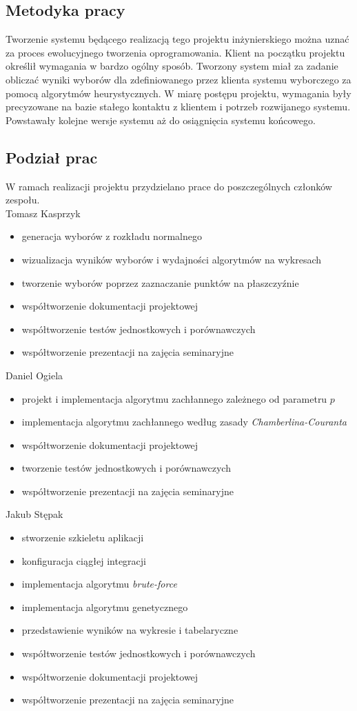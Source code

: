 \documentclass[polish,11pt]{aghthesis}
\begin{document}
\subsection{Metodyka pracy}
Tworzenie systemu będącego realizacją tego projektu inżynierskiego można uznać za
proces ewolucyjnego tworzenia oprogramowania. Klient na początku projektu określił
wymagania w bardzo ogólny sposób. Tworzony system miał za zadanie obliczać wyniki
wyborów dla zdefiniowanego przez klienta systemu wyborczego za pomocą algorytmów
heurystycznych. W miarę postępu projektu, wymagania były precyzowane na bazie stałego
kontaktu z klientem i potrzeb rozwijanego systemu. Powstawały kolejne wersje systemu aż
do osiągnięcia systemu końcowego.

\subsection{Podział prac}
W ramach realizacji projektu przydzielano prace do poszczególnych członków zespołu.
\vspace{\baselineskip} \\
Tomasz Kasprzyk
\begin{itemize}
\item generacja wyborów z rozkładu normalnego
\item wizualizacja wyników wyborów i wydajności algorytmów na wykresach
\item tworzenie wyborów poprzez zaznaczanie punktów na płaszczyźnie
\item współtworzenie dokumentacji projektowej
\item współtworzenie testów jednostkowych i porównawczych
\item współtworzenie prezentacji na zajęcia seminaryjne
\end{itemize}
Daniel Ogiela
\begin{itemize}
\item projekt i implementacja algorytmu zachłannego zależnego od parametru $p$
\item implementacja algorytmu zachłannego według zasady \textit{Chamberlina-Couranta}
\item współtworzenie dokumentacji projektowej
\item tworzenie testów jednostkowych i porównawczych
\item współtworzenie prezentacji na zajęcia seminaryjne 
\end{itemize}
Jakub Stępak
\begin{itemize}
\item stworzenie szkieletu aplikacji
\item konfiguracja ciągłej integracji
\item implementacja algorytmu \textit{brute-force}
\item implementacja algorytmu genetycznego
\item przedstawienie wyników na wykresie i tabelaryczne
\item współtworzenie testów jednostkowych i porównawczych
\item współtworzenie dokumentacji projektowej
\item współtworzenie prezentacji na zajęcia seminaryjne
\end{itemize}
\end{document}
